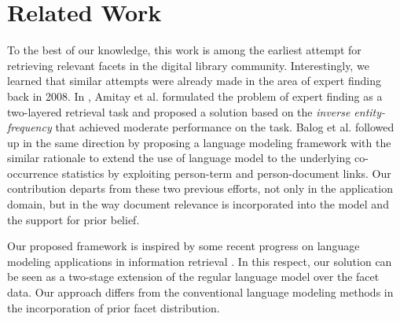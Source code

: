 

\section{Related Work}\label{s:related-work}

To the best of our knowledge, this work is among the earliest attempt for
retrieving relevant facets in the digital library community.  Interestingly, we
learned that similar attempts were already made in the area of expert finding
back in 2008.  In \cite{amitay2008finding}, Amitay et al. formulated the
problem of expert finding as a two-layered retrieval task and proposed a
solution based on the \emph{inverse entity-frequency} that achieved moderate
performance on the task.  Balog et al. \cite{balog2009language} followed up in
the same direction by proposing a language modeling framework with the similar
rationale to extend the use of language model to the underlying co-occurrence
statistics by exploiting person-term and person-document links.  Our
contribution departs from these two previous efforts, not only in the
application domain, but in the way document relevance is incorporated into the
model and the support for prior belief.  
 
Our proposed framework is inspired by some recent progress on language modeling
applications in information retrieval
\cite{lavrenko2001relevance,zaragorza2003bayesian}.  In this respect, our
solution can be seen as a two-stage extension of the regular language model
over the facet data.  Our approach differs from the conventional language
modeling methods in the incorporation of prior facet distribution.

